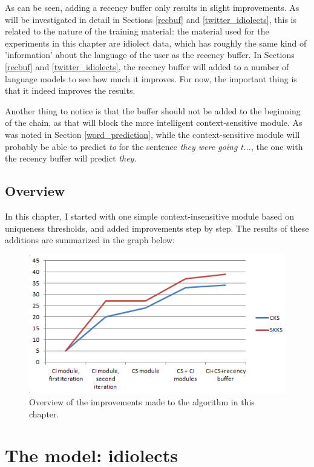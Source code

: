 \documentclass[11pt]{article}
\let\stdsection\section
\renewcommand\section{\newpage\stdsection}
\begin{document}
As can be seen, adding a recency buffer only results in slight improvements. As will be investigated in detail in Sections \ref{recbuf} and \ref{twitter_idiolects}, this is related to the nature of the training material: the material used for the experiments in this chapter are idiolect data, which has roughly the same kind of 'information' about the language of the user as the recency buffer. In Sections \ref{recbuf} and \ref{twitter_idiolects}, the recency buffer will added to a number of language models to see how much it improves. For now, the important thing is that it indeed improves the results. 

Another thing to notice is that the buffer should not be added to the beginning of the chain, as that will block the more intelligent context-sensitive module. As was noted in Section \ref{word_prediction}, while the context-sensitive module will probably be able to predict \emph{to} for the sentence \emph{they were going t...}, the one with the recency buffer will predict \emph{they}.

\subsection{Overview}
In this chapter, I started with one simple context-insensitive module based on uniqueness thresholds, and added improvements step by step. The results of these additions are summarized in the graph below:

\begin{figure}[H] \centering
\includegraphics[scale=1]{overview}
\caption{Overview of the improvements made to the algorithm in this chapter.}
\label{overview}
\end{figure} 






\section{The model: idiolects} \label{model}
\end{document}
